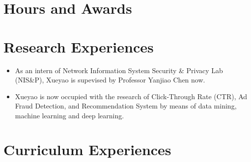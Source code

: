 \documentclass[letterpaper]{twentysecondcv} %
\begin{document}
\begin{CJK*}{UTF8}{gbsn}

\section{Hours and Awards}

\begin{twentyshort} %
\end{twentyshort}


\section{Research Experiences}

\begin{itemize}
	\item As an intern of Network Information System Security \& Privacy Lab (NIS\&P), 
		Xueyao is supevised by Professor Yanjiao Chen now.
	\item Xueyao is now occupied with the research of 
		Click-Through Rate (CTR), Ad Fraud Detection, and Recommendation System 
		by means of data mining, machine learning and deep learning.
\end{itemize}


\section{Curriculum Experiences}



\end{CJK*}
\end{document}
